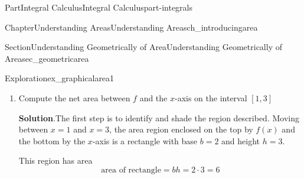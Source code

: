 \documentclass[oneside,10pt,]{tufte-book}
\newcommand{\blocktitlefont}{\relax}
\numberwithin{equation}{chapter}
\begin{document}
\begin{partptx}{Part}{Integral Calculus}{}{Integral Calculus}{}{}{part-integrals}
\begin{chapterptx}{Chapter}{Understanding Areas}{}{Understanding Areas}{}{}{ch_introducingarea}
\begin{sectionptx}{Section}{Understanding Geometrically of Area}{}{Understanding Geometrically of Area}{}{}{sec_geometricarea}
\begin{exploration}{Exploration}{}{ex_graphicalarea1}
\begin{enumerate}[font=\bfseries,label=(\alph*),ref=\alph*]
\begin{image}{0.25}{0.5}{0.25}{}
{\begin{tikzpicture}
\end{tikzpicture}
}%
\end{image}%
\item{}Compute the net area between \(f\) and the \(x\)-axis on the interval \([1,3]\)%
\par\smallskip%
\noindent\textbf{\blocktitlefont Solution}.\hypertarget{ex_graphicalarea1-3-2}{}\quad{}The first step is to identify and shade the region described. Moving between \(x=1\) and \(x=3\), the area region enclosed on the top by \(f(x)\) and the bottom by the \(x\)-axis is a rectangle with base \(b=2\) and height \(h=3\).%
\par
This region has area%
\begin{equation*}
\text{area of rectangle} = b h = 2 \cdot 3 = 6 
\end{equation*}
%
\begin{image}{0.25}{0.5}{0.25}{}%
\end{image}
\end{enumerate}
\end{exploration}
\end{sectionptx}
\end{chapterptx}
\end{partptx}
\end{document}
